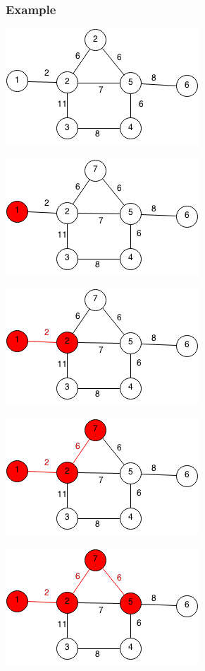 \documentclass[11pt,oneside]{book}
\makeatletter
\def\maxwidth#1{\ifdim\Gin@nat@width>#1 #1\else\Gin@nat@width\fi}
\makeatother
\begin{document}
\subsubsection{Example}

\includegraphics[width=\maxwidth{\textwidth}]{prim.png}

\includegraphics[width=\maxwidth{\textwidth}]{prim1.png}

\includegraphics[width=\maxwidth{\textwidth}]{prim2.png}

\includegraphics[width=\maxwidth{\textwidth}]{prim3.png}

\includegraphics[width=\maxwidth{\textwidth}]{prim4.png}
\end{document}

